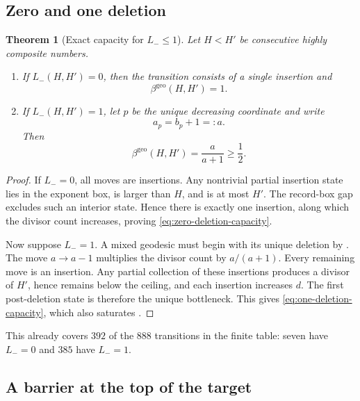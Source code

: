 \documentclass[11pt]{article}
\numberwithin{equation}{section}
\theoremstyle{blueplain}
\newtheorem{theorem}{Theorem}[section]
\theoremstyle{bluedef}
\newcommand{\betageo}{\beta^{\mathrm{geo}}}
\begin{document}
\subsection{Zero and one deletion}

\begin{theorem}[Exact capacity for $L_-\le1$]
\label{thm:one-deletion}
Let $H<H'$ be consecutive highly composite numbers.

\begin{enumerate}[label=\textup{(\roman*)}]
\item If $L_-(H,H')=0$, then the transition consists of a single insertion and
\begin{equation}
 \betageo(H,H')=1.
 \label{eq:zero-deletion-capacity}
\end{equation}

\item If $L_-(H,H')=1$, let $p$ be the unique decreasing coordinate and write
\[
 a_p=b_p+1=:a.
\]
Then
\begin{equation}
 \boxed{\betageo(H,H')=\frac{a}{a+1}\ge\frac12.}
 \label{eq:one-deletion-capacity}
\end{equation}
\end{enumerate}
\end{theorem}

\begin{proof}
If $L_-=0$, all moves are insertions.  Any nontrivial partial insertion state lies in the exponent box, is larger than $H$, and is at most $H'$.  The record-box gap excludes such an interior state.  Hence there is exactly one insertion, along which the divisor count increases, proving \eqref{eq:zero-deletion-capacity}.

Now suppose $L_-=1$.  A mixed geodesic must begin with its unique deletion by .  The move $a\to a-1$ multiplies the divisor count by $a/(a+1)$.  Every remaining move is an insertion.  Any partial collection of these insertions produces a divisor of $H'$, hence remains below the ceiling, and each insertion increases $d$.  The first post-deletion state is therefore the unique bottleneck.  This gives \eqref{eq:one-deletion-capacity}, which also saturates .
\end{proof}

This already covers $392$ of the $888$ transitions in the finite table: seven have $L_-=0$ and $385$ have $L_-=1$.

\subsection{A barrier at the top of the target}
\end{document}
